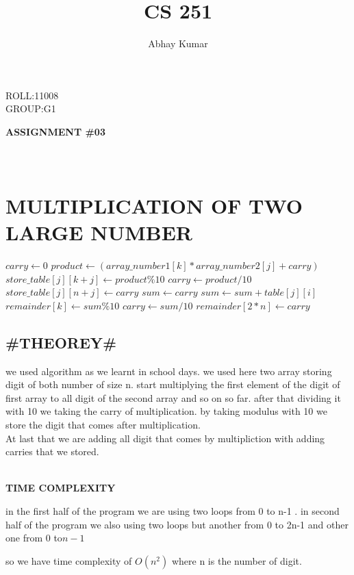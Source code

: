 \documentclass{article}
\begin{document}
\title{CS 251}
\author{Abhay Kumar}
\maketitle
ROLL:11008\\
GROUP:G1
\begin{center}
\textbf{\huge ASSIGNMENT \#03}\\
\ \\
\ \\
\section{MULTIPLICATION OF TWO LARGE NUMBER}
\end{center}
\begin{algorithmic}
\State $carry \gets 0$
\State $ product \gets (array\_number1[k]*array\_number2[j]+carry)$
\State $ store\_table[j][k + j] \gets product \% 10 $
\State $carry \gets product/10$
\EndFor
\State $store\_table[j][n+j] \gets carry$
\EndFor
{}
\State $sum \gets carry$
\State$sum \gets sum + table[j][i]$
\EndFor
\State $remainder[k] \gets  sum \% 10$
\State $carry \gets sum/10$
\EndFor
\State $remainder[2*n] \gets carry$
\end{algorithmic}
\begin{center}
\subsection {\#THEOREY\#}
 
\end{center}
 we used algorithm as we learnt in school days.
 we used here two array storing  digit of both number of size n.
 start multiplying the first element of the digit of first array to all digit of the second array and so on so far.
 after that dividing it with 10 we taking the carry of multiplication.
 by taking modulus  with 10 we store the digit that comes after multiplication. \\
 At last that we are adding all digit that comes by multipliction with adding carries that we stored.
\ \\
\ \\
\begin{center}
\textbf{\huge TIME COMPLEXITY}

 in the first half of the program we are using two loops from 0 to n-1 .
 in second half of the program we also using two loops but another from
 0 to 2n-1 and other one from 0 to$ n-1$

 so we have time complexity of $O(n^2)$ where n is the number of digit. 

\end{center}
\end{document}
